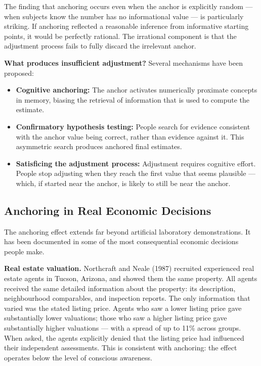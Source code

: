 \documentclass[12pt, letterpaper]{article}
\begin{document}
The finding that anchoring occurs even when the anchor is explicitly random --- when subjects know the number has no informational value --- is particularly striking. If anchoring reflected a reasonable inference from informative starting points, it would be perfectly rational. The irrational component is that the adjustment process fails to fully discard the irrelevant anchor.

\textbf{What produces insufficient adjustment?} Several mechanisms have been proposed:

\begin{itemize}
\item \textbf{Cognitive anchoring:} The anchor activates numerically proximate concepts in memory, biasing the retrieval of information that is used to compute the estimate.
\item \textbf{Confirmatory hypothesis testing:} People search for evidence consistent with the anchor value being correct, rather than evidence against it. This asymmetric search produces anchored final estimates.
\item \textbf{Satisficing the adjustment process:} Adjustment requires cognitive effort. People stop adjusting when they reach the first value that seems plausible --- which, if started near the anchor, is likely to still be near the anchor.
\end{itemize}


\subsection{Anchoring in Real Economic Decisions}


The anchoring effect extends far beyond artificial laboratory demonstrations. It has been documented in some of the most consequential economic decisions people make.

\textbf{Real estate valuation.} Northcraft and Neale (1987) recruited experienced real estate agents in Tucson, Arizona, and showed them the same property. All agents received the same detailed information about the property: its description, neighbourhood comparables, and inspection reports. The only information that varied was the stated listing price. Agents who saw a lower listing price gave substantially lower valuations; those who saw a higher listing price gave substantially higher valuations --- with a spread of up to 11\% across groups. When asked, the agents explicitly denied that the listing price had influenced their independent assessments. This is consistent with anchoring: the effect operates below the level of conscious awareness.
\end{document}
